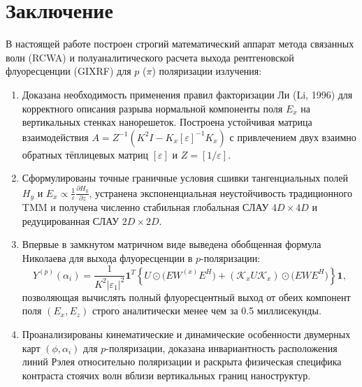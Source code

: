 \documentclass[a4paper,11pt]{article}
\begin{document}
\newpage
\section*{Заключение}

В настоящей работе построен строгий математический аппарат метода связанных волн (RCWA) и полуаналитического расчета выхода рентгеновской флуоресценции (GIXRF) для $p$ ($\pi$) поляризации излучения:

\begin{enumerate}
    \item Доказана необходимость применения правил факторизации Ли (Li, 1996) для корректного описания разрыва нормальной компоненты поля $E_x$ на вертикальных стенках нанорешеток. Построена устойчивая матрица взаимодействия $A = Z^{-1} (K^2 I - K_x [\varepsilon]^{-1} K_x)$ с привлечением двух взаимно обратных тёплицевых матриц $[\varepsilon]$ и $Z = [1/\varepsilon]$.
    \item Сформулированы точные граничные условия сшивки тангенциальных полей $H_y$ и $E_x \propto \frac{1}{\varepsilon} \frac{\partial H_y}{\partial z}$, устранена экспоненциальная неустойчивость традиционного TMM и получена численно стабильная глобальная СЛАУ $4D \times 4D$ и редуцированная СЛАУ $2D \times 2D$.
    \item Впервые в замкнутом матричном виде выведена обобщенная формула Николаева для выхода флуоресценции в $p$-поляризации:
    \begin{equation*}
        Y^{(p)}(\alpha_i) = \frac{1}{K^2 |\varepsilon_1|^2} \mathbf{1}^T \left\{ U \odot \big( E W^{(x)} E^H \big) + (\mathcal{K}_x U \mathcal{K}_x) \odot \big( E W E^H \big) \right\} \mathbf{1},
    \end{equation*}
    позволяющая вычислять полный флуоресцентный выход от обеих компонент поля $(E_x, E_z)$ строго аналитически менее чем за 0.5 миллисекунды.
    \item Проанализированы кинематические и динамические особенности двумерных карт $(\phi, \alpha_i)$ для $p$-поляризации, доказана инвариантность расположения линий Рэлея относительно поляризации и раскрыта физическая специфика контраста стоячих волн вблизи вертикальных границ наноструктур.
\end{enumerate}
\end{document}
